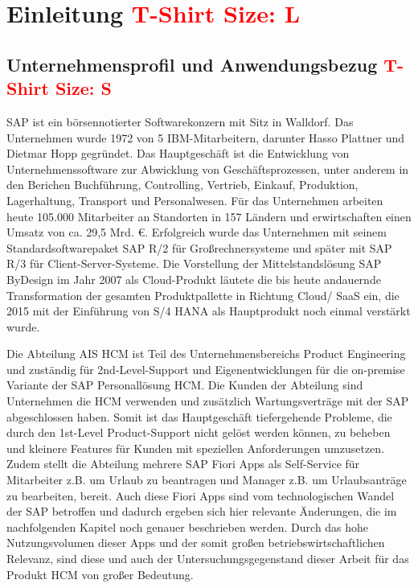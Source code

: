 \chapter{Einleitung \textcolor{red}{T-Shirt Size: L}}

\section{Unternehmensprofil und Anwendungsbezug \textcolor{red}{T-Shirt Size: S}}

SAP ist ein börsennotierter Softwarekonzern mit Sitz in Walldorf. Das Unternehmen wurde 1972 von 5 IBM-Mitarbeitern, darunter Hasso Plattner und Dietmar Hopp gegründet. Das Hauptgeschäft ist die Entwicklung von Unternehmenssoftware zur Abwicklung von Geschäftsprozessen, unter anderem in den Berichen Buchführung, Controlling, Vertrieb, Einkauf, Produktion, Lagerhaltung, Transport und Personalwesen. Für das Unternehmen arbeiten heute 105.000 Mitarbeiter an Standorten in 157 Ländern und erwirtschaften einen Umsatz von ca. 29,5 Mrd. \euro{}. Erfolgreich wurde das Unternehmen mit seinem Standardsoftwarepaket SAP R/2 für Gro{\ss}rechnersysteme und später mit SAP R/3 für Client-Server-Systeme. Die Vorstellung der Mittelstandslösung SAP ByDesign im Jahr 2007 als Cloud-Produkt läutete die bis heute andauernde Transformation der gesamten Produktpallette in Richtung Cloud/ SaaS ein, die 2015 mit der Einführung von S/4 HANA als Hauptprodukt noch einmal verstärkt wurde.

Die Abteilung AIS HCM ist Teil des Unternehmensbereichs Product Engineering und zuständig für 2nd-Level-Support und Eigenentwicklungen für die on-premise Variante der SAP Personallösung HCM. Die Kunden der Abteilung sind Unternehmen die HCM verwenden und zusätzlich Wartungsverträge mit der SAP abgeschlossen haben. Somit ist das Hauptgeschäft tiefergehende Probleme, die durch den 1st-Level Product-Support nicht gelöst werden können, zu beheben und kleinere Features für Kunden mit speziellen Anforderungen umzusetzen. Zudem stellt die Abteilung mehrere SAP Fiori Apps als Self-Service für Mitarbeiter z.B. um Urlaub zu beantragen und Manager z.B. um Urlaubsanträge zu bearbeiten, bereit. Auch diese Fiori Apps sind vom technologischen Wandel der SAP betroffen und dadurch ergeben sich hier relevante Änderungen, die im nachfolgenden Kapitel noch genauer beschrieben werden. Durch das hohe Nutzungsvolumen dieser Apps und der somit gro{\ss}en betriebswirtschaftlichen Relevanz, sind diese und auch der Untersuchungsgegenstand dieser Arbeit für das Produkt HCM von gro{\ss}er Bedeutung.

